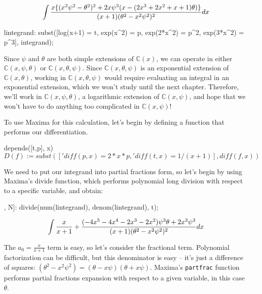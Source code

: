 

$$\int{{x\{(x^2 \psi^2-\theta^2)^2+2x \psi^3(x-(2x^3+2x^2+x+1)\theta)\}}\over{(x+1)(\theta^2 - x^2\psi^2)^2}} dx$$

\begin{maximacode}
lintegrand:
   subst([log(x+1) = t,
          exp(x^2) = p,
          exp(2*x^2) = p^2,
          exp(3*x^2) = p^3],
      integrand);
\end{maximacode}

Since $\psi$ and $\theta$ are both simple extensions of ${\mathbb C}(x)$, we can operate in either
${\mathbb C}(x,\psi,\theta)$ or ${\mathbb C}(x,\theta,\psi)$.  Since ${\mathbb C}(x,\theta,\psi)$
is an exponential extension of ${\mathbb C}(x,\theta)$, working in ${\mathbb C}(x,\theta,\psi)$
would require evaluating an integral in an exponential extension, which we won't study until
the next chapter.  Therefore, we'll work in ${\mathbb C}(x,\psi,\theta)$, a logarithmic
extension of ${\mathbb C}(x,\psi)$, and hope that we won't have to do anything
too complicated in ${\mathbb C}(x,\psi)$!

To use Maxima for this calculation, let's begin by defining
a function that performs our differentiation.

\begin{maximacode}
depends([t,p], x)$
D(f) := subst(['diff(p,x) = 2*x*p,
               'diff(t,x) = 1/(x+1)],
              diff(f,x))$
\end{maximacode}

We need to put our integrand into partial fractions form, so let's begin by
using Maxima's {\ttfamily divide} function, which performs polynomial long division
with respect to a specific variable, and obtain:

\begin{maximacode}
[a[0], N]:
   divide(num(lintegrand),
          denom(lintegrand), t);
\end{maximacode}


$$\int {x\over{x+1}} + {{(-4x^5-4x^4-2x^3-2x^2)\psi^3\theta + {2x^3}\psi^3}\over{(x+1)(\theta^2 - x^2\psi^2)^2}} dx$$

The $a_0 = \frac{x}{x+1}$ term is easy, so let's consider the fractional
term.  Polynomial factorization can be difficult, but this denominator
is easy -- it's just a difference of squares: $(\theta^2 - x^2\psi^2) = (\theta-x\psi)(\theta+x\psi)$.
Maxima's {\tt partfrac} function performs partial fractions
expansion with respect to a given variable, in this case $\theta$.

